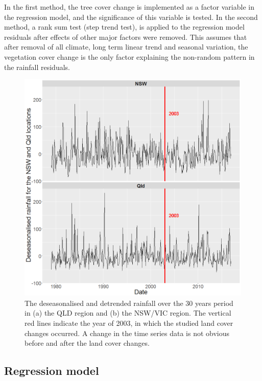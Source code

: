 \documentclass[fleqn,10pt,lineno]{wlpeerj} %
\begin{document}
In the first method, the tree cover change is implemented as a factor
variable in the regression model, and the significance of this variable
is tested. In the second method, a rank sum test (step trend test), is
applied to the regression model residuals after effects of other major
factors were removed. This assumes that after removal of all climate,
long term linear trend and seasonal variation, the vegetation cover
change is the only factor explaining the non-random pattern in the
rainfall residuals.

\begin{figure}
\includegraphics[width=0.9\linewidth]{figures/Rainfall_resid} \caption{The deseasonalised and detrended rainfall over the 30 years period in (a) the QLD region and (b) the NSW/VIC region. The vertical red lines indicate the year of 2003, in which the studied land cover changes occurred. A change in the time series data is not obvious before and after the land cover changes.}\label{fig:ts-mean}
\end{figure}

\subsection{Regression model}\label{reg_model}
\end{document}
